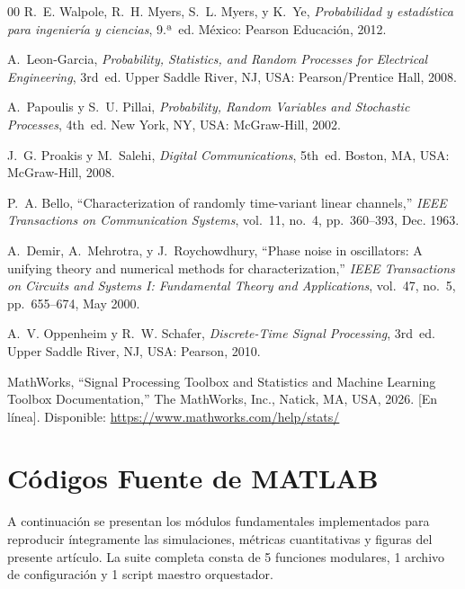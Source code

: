 \documentclass[conference]{IEEEtran}
\begin{document}
\begin{thebibliography}{00}
R.~E. Walpole, R.~H. Myers, S.~L. Myers, y K.~Ye, \emph{Probabilidad y estadística para ingeniería y ciencias}, 9.ª~ed. México: Pearson Educación, 2012.

A.~Leon-Garcia, \emph{Probability, Statistics, and Random Processes for Electrical Engineering}, 3rd~ed. Upper Saddle River, NJ, USA: Pearson/Prentice Hall, 2008.

A.~Papoulis y S.~U. Pillai, \emph{Probability, Random Variables and Stochastic Processes}, 4th~ed. New York, NY, USA: McGraw-Hill, 2002.

J.~G. Proakis y M.~Salehi, \emph{Digital Communications}, 5th~ed. Boston, MA, USA: McGraw-Hill, 2008.

P.~A. Bello, ``Characterization of randomly time-variant linear channels,'' \emph{IEEE Transactions on Communication Systems}, vol.~11, no.~4, pp.~360--393, Dec. 1963.

A.~Demir, A.~Mehrotra, y J.~Roychowdhury, ``Phase noise in oscillators: A unifying theory and numerical methods for characterization,'' \emph{IEEE Transactions on Circuits and Systems I: Fundamental Theory and Applications}, vol.~47, no.~5, pp.~655--674, May 2000.

A.~V. Oppenheim y R.~W. Schafer, \emph{Discrete-Time Signal Processing}, 3rd~ed. Upper Saddle River, NJ, USA: Pearson, 2010.

MathWorks, ``Signal Processing Toolbox and Statistics and Machine Learning Toolbox Documentation,'' The MathWorks, Inc., Natick, MA, USA, 2026. [En línea]. Disponible: \url{https://www.mathworks.com/help/stats/}
\end{thebibliography}

\appendices
\section{Códigos Fuente de MATLAB}
A continuación se presentan los módulos fundamentales implementados para reproducir íntegramente las simulaciones, métricas cuantitativas y figuras del presente artículo. La suite completa consta de 5 funciones modulares, 1 archivo de configuración y 1 script maestro orquestador.
\end{document}
